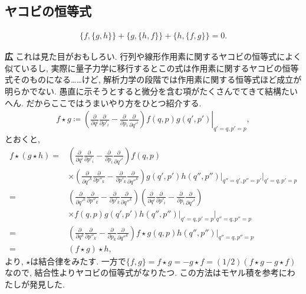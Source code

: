 \documentclass{ltjsarticle}
\theoremstyle{definition}
\newcommand{\parno}{\par\noindent}
\begin{document}
\subsection{ヤコビの恒等式}
\begin{tcolorbox}
\begin{gather}
\{f,\{g,h\}\}+\{g,\{h,f\}\}+\{h,\{f,g\}\}=0.
\end{gather}
\end{tcolorbox}
\parno
\textbf{広} これは見た目がおもしろい. 行列や線形作用素に関するヤコビの恒等式によく似ているし, 実際に量子力学に移行するとこの式は作用素に関するヤコビの恒等式そのものになる……けど, 解析力学の段階では作用素に関する恒等式ほど成立が明らかでない. 愚直に示そうとすると微分を含む項がたくさんでてきて結構たいへん. だからここではうまいやり方をひとつ紹介する.
\begin{gather}
f\star g\coloneqq\left.\left(\frac\partial{\partial q^i}\frac\partial{\partial p'_i}-\frac\partial{\partial p_i}\frac\partial{\partial q'^i}\right)f(q,p)g(q',p')\right|_{q'=q,p'=p},
\end{gather}
とおくと,
\begin{align}
f\star(g\star h)=&\left(\frac\partial{\partial q^i}\frac\partial{\partial p'_i}-\frac\partial{\partial p_i}\frac\partial{\partial q'^i}\right)f(q,p)\\
&\times\left(\frac\partial{\partial q'^k}\frac\partial{\partial p''_k}-\frac\partial{\partial p'_k}\frac\partial{\partial q''^k}\right)g(q',p')h(q'',p'')\bigg|_{q''=q',p''=p'}\bigg|_{q'=q,p'=p}\\
=&\left(\frac\partial{\partial q'^k}\frac\partial{\partial p''_k}-\frac\partial{\partial p'_k}\frac\partial{\partial q''^k}\right)\left(\frac\partial{\partial q^i}\frac\partial{\partial p'_i}-\frac\partial{\partial p_i}\frac\partial{\partial q'^i}\right)\\
&\times f(q,p)g(q',p')h(q'',p'')\bigg|_{q'=q,p'=p}\bigg|_{q''=q,p''=p}\\
=&\left(\frac\partial{\partial q^k}\frac\partial{\partial p''_k}-\frac\partial{\partial p_k}\frac\partial{\partial q''^k}\right)f\star g(q,p)h(q'',p'')\bigg|_{q''=q,p''=p}\\
=&(f\star g)\star h,
\end{align}
より, $\star$は結合律をみたす. 一方で$\{f,g\}=f\star g=-g\star f=(1/2)(f\star g-g\star f)$なので, 結合性よりヤコビの恒等式がなりたつ.
この方法はモヤル積\cite{bib_analytic_mechanics3}を参考にわたしが発見した.
\end{document}
